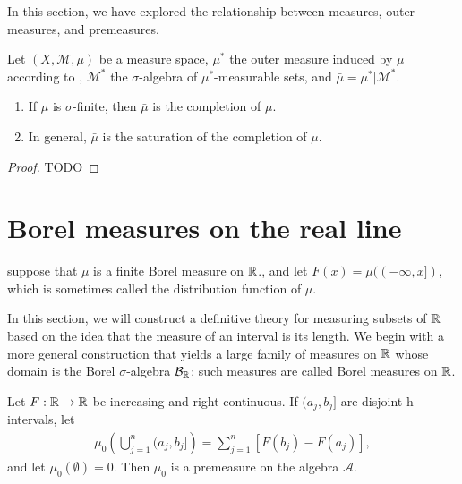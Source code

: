 In this section, we have explored the relationship between measures, outer measures, and premeasures.



\begin{proposition}
    Let $(X, \mathcal{M}, \mu)$ be a measure space, $\mu^*$ the outer measure induced by $\mu$ according to , $\mathcal{M}^*$ the $\sigma$-algebra of $\mu^*$-measurable sets, and $\bar{\mu} = \mu^*|\mathcal{M}^*$.
    \begin{enumerate}
        \item If $\mu$ is $\sigma$-finite, then $\bar{\mu}$ is the completion of $\mu$.
        \item In general, $\bar{\mu}$ is the saturation of the completion of $\mu$.
    \end{enumerate}
\end{proposition}

\begin{proof}
    TODO
\end{proof}

\section{Borel measures on the real line}

\begin{definition}
    suppose that $\mu$ is a finite Borel measure on $\mathbb{R}$., and let $F(x) = \mu((-\infty, x])$, which is sometimes called the distribution function of $\mu$.
\end{definition}


In this section, we will construct a definitive theory for measuring subsets of $\mathbb{R}$ based on the idea that the measure of an interval is its length.
We begin with a more general construction that yields a large family of measures on $\mathbb{R}$ whose domain is the Borel $\sigma$-algebra $\mathcal{B}_{\mathbb{R}}$; such measures are called Borel measures on $\mathbb{R}$.

\begin{proposition}
    Let $F:\mathbb{R} \to \mathbb{R}$ be increasing and right continuous.
    If $(a_j, b_j]$ are disjoint h-intervals, let
    \begin{align}
        \mu_0 \left(\bigcup_{j=1}^{n} (a_j, b_j] \right) = \sum_{j=1}^{n} [F(b_j) - F(a_j)],
    \end{align}
    and let $\mu_0(\emptyset) = 0$.
    Then $\mu_0$ is a premeasure on the algebra $\mathcal{A}$.
\end{proposition}

